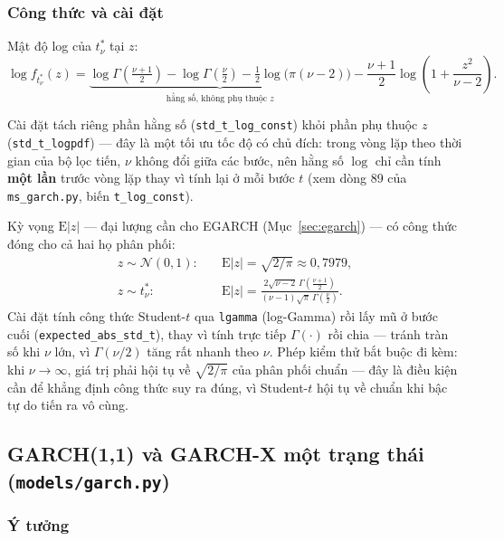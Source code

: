 \documentclass[11pt,a4paper]{article}
\newcommand{\code}[1]{\texttt{#1}}
\newcommand{\file}[1]{\texttt{#1}}
\begin{document}
\subsubsection{Công thức và cài đặt}

Mật độ log của $t^*_\nu$ tại $z$:
\begin{equation}
\log f_{t^*_\nu}(z) = \underbrace{\log\Gamma\!\left(\tfrac{\nu+1}{2}\right) -
\log\Gamma\!\left(\tfrac{\nu}{2}\right) - \tfrac12\log\!\big(\pi(\nu-2)\big)}_{\text{hằng
số, không phụ thuộc } z} - \frac{\nu+1}{2}\log\!\left(1+\frac{z^2}{\nu-2}\right).
\end{equation}

Cài đặt tách riêng phần hằng số (\code{std\_t\_log\_const}) khỏi phần phụ thuộc $z$
(\code{std\_t\_logpdf}) --- đây là một tối ưu tốc độ có chủ đích: trong vòng lặp theo
thời gian của bộ lọc tiến, $\nu$ không đổi giữa các bước, nên hằng số $\log$ chỉ cần
tính \textbf{một lần} trước vòng lặp thay vì tính lại ở mỗi bước $t$ (xem dòng 89 của
\code{ms\_garch.py}, biến \code{t\_log\_const}).

Kỳ vọng $\mathrm{E}|z|$ --- đại lượng cần cho EGARCH (Mục~\ref{sec:egarch}) --- có
công thức đóng cho cả hai họ phân phối:
\begin{align}
z \sim \mathcal N(0,1): &\quad \mathrm{E}|z| = \sqrt{2/\pi} \approx 0{,}7979, \\
z \sim t^*_\nu: &\quad \mathrm{E}|z| = \frac{2\sqrt{\nu-2}\,
\Gamma\!\left(\tfrac{\nu+1}{2}\right)}{(\nu-1)\sqrt{\pi}\,\Gamma\!\left(\tfrac{\nu}{2}\right)}.
\end{align}
Cài đặt tính công thức Student-$t$ qua \code{lgamma} (log-Gamma) rồi lấy mũ ở bước
cuối (\code{expected\_abs\_std\_t}), thay vì tính trực tiếp $\Gamma(\cdot)$ rồi chia
--- tránh tràn số khi $\nu$ lớn, vì $\Gamma(\nu/2)$ tăng rất nhanh theo $\nu$. Phép
kiểm thử bắt buộc đi kèm: khi $\nu\to\infty$, giá trị phải hội tụ về $\sqrt{2/\pi}$
của phân phối chuẩn --- đây là điều kiện cần để khẳng định công thức suy ra đúng, vì
Student-$t$ hội tụ về chuẩn khi bậc tự do tiến ra vô cùng.

\subsection{GARCH(1,1) và GARCH-X một trạng thái (\file{models/garch.py})}

\subsubsection{Ý tưởng}
\end{document}
